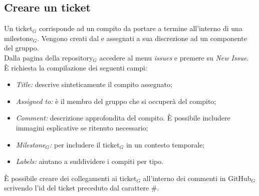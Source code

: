 \subsection{Creare un ticket}
Un ticket$_G$ corrisponde ad un compito da portare a termine all'interno di una milestone$_G$. Vengono creati dal \ruoloResponsabile{} e assegnati a sua discrezione ad un componente del gruppo. \\
Dalla pagina della repository$_G$ accedere al menu \textit{issues} e premere su \textit{New Issue}.\\
È richiesta la compilazione dei seguenti campi:
\begin{itemize}
    \item \textit{Title:} descrive sinteticamente il compito assegnato;
    \item \textit{Assigned to:} è il membro del gruppo che si occuperà del compito;
    \item \textit{Comment:} descrizione approfondita del compito. È possibile includere immagini esplicative se ritenuto necessario;
    \item \textit{Milestone$_G$:} per includere il ticket$_G$ in un contesto temporale;
    \item \textit{Labels:} aiutano a suddividere i compiti per tipo.
\end{itemize}
È possibile creare dei collegamenti ai ticket$_G$ all'interno dei commenti in GitHub$_G$ scrivendo l'id del ticket preceduto dal carattere \#.

